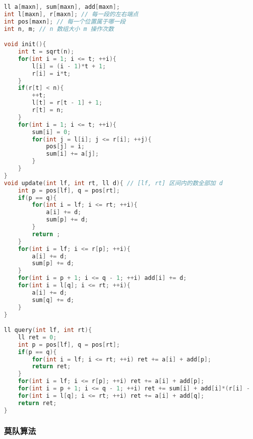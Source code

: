 \begin{lstlisting}[language=C++]
ll a[maxn], sum[maxn], add[maxn];
int l[maxn], r[maxn]; // 每一段的左右端点
int pos[maxn]; // 每一个位置属于哪一段
int n, m; // n 数组大小 m 操作次数

void init(){
    int t = sqrt(n);
    for(int i = 1; i <= t; ++i){
        l[i] = (i - 1)*t + 1;
        r[i] = i*t;
    }
    if(r[t] < n){
        ++t;
        l[t] = r[t - 1] + 1;
        r[t] = n;
    }
    for(int i = 1; i <= t; ++i){
        sum[i] = 0;
        for(int j = l[i]; j <= r[i]; ++j){
            pos[j] = i;
            sum[i] += a[j];
        }
    }
}
void update(int lf, int rt, ll d){ // [lf, rt] 区间内的数全部加 d
    int p = pos[lf], q = pos[rt];
    if(p == q){
        for(int i = lf; i <= rt; ++i){
            a[i] += d;
            sum[p] += d;
        }
        return ;
    }
    for(int i = lf; i <= r[p]; ++i){
        a[i] += d;
        sum[p] += d;
    }
    for(int i = p + 1; i <= q - 1; ++i) add[i] += d;
    for(int i = l[q]; i <= rt; ++i){
        a[i] += d;
        sum[q] += d;
    }
}

ll query(int lf, int rt){
    ll ret = 0;
    int p = pos[lf], q = pos[rt];
    if(p == q){
        for(int i = lf; i <= rt; ++i) ret += a[i] + add[p];
        return ret;
    }
    for(int i = lf; i <= r[p]; ++i) ret += a[i] + add[p];
    for(int i = p + 1; i <= q - 1; ++i) ret += sum[i] + add[i]*(r[i] - l[i] + 1LL);
    for(int i = l[q]; i <= rt; ++i) ret += a[i] + add[q];
    return ret;
}
\end{lstlisting}

\subsubsection{莫队算法}

